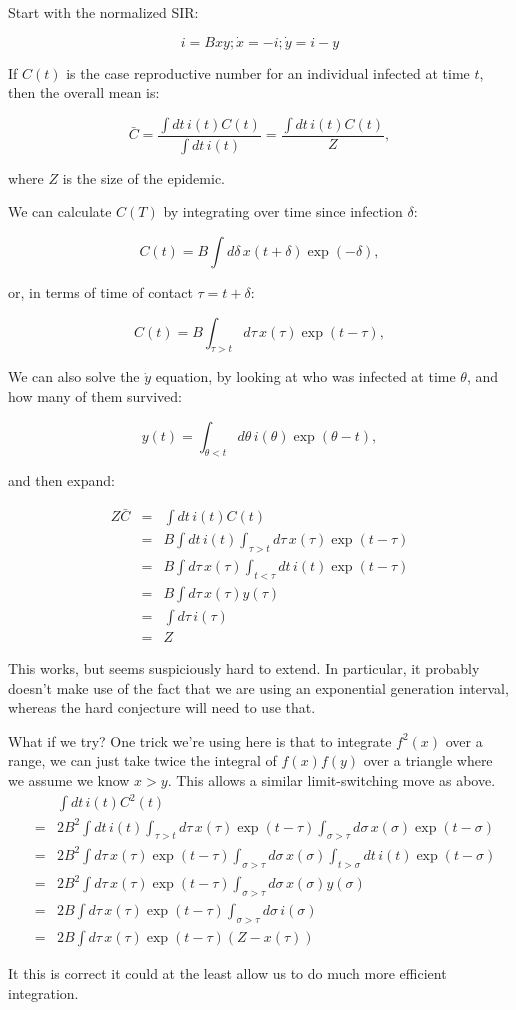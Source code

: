 \documentclass[12pt]{article}
\begin{document}
Start with the normalized SIR:

$$ i = Bxy; \dot x = -i; \dot y = i-y $$

If $C(t)$ is the case reproductive number for an individual infected at time $t$, then the overall mean is:

$$
	\bar C 
	= \frac{\int{dt\, i(t) C(t)}}{\int{dt\, i(t)}}
	= \frac{\int{dt\, i(t) C(t)}}{Z}, 
$$

where $Z$ is the size of the epidemic.

We can calculate $C(T)$ by integrating over time since infection $\delta$:

$$C(t) = B \int{d\delta\, x(t+\delta) \exp(-\delta)}, $$

or, in terms of time of contact $\tau=t+\delta$:

$$C(t) = B \int_{\tau>t}{d\tau\, x(\tau) \exp(t-\tau)}, $$

We can also solve the $\dot y$ equation, by looking at who was infected at time $\theta$, and how many of them survived:

$$ y(t) = \int_{\theta<t}{d\theta\, i(\theta)\exp(\theta-t)},$$

and then expand:

\begin{eqnarray}
	Z \bar C
	&=& \int{dt\, i(t) C(t)}
	\\ &=& B \int{dt\, i(t) \int_{\tau>t}{d\tau\, x(\tau) \exp(t-\tau)}}
	\\ &=& B \int{d\tau\, x(\tau) \int_{t<\tau}dt\, i(t) \exp(t-\tau)}
	\\ &=& B \int{d\tau\, x(\tau) y(\tau)}
	\\ &=& \int{d\tau\, i(\tau)}
	\\ &=& Z
\end{eqnarray}

This works, but seems suspiciously hard to extend. In particular, it probably doesn't make use of the fact that we are using an exponential generation interval, whereas the hard conjecture will need to use that.

What if we try? One trick we're using here is that to integrate $f^2(x)$ over a range, we can just take twice the integral of $f(x)f(y)$ over a triangle where we assume we know $x>y$. This allows a similar limit-switching move as above.
\begin{eqnarray}
	&& \int{dt\, i(t) C^2(t)}
	\\ &=& 2B^2 \int{dt\, i(t) \int_{\tau>t}{d\tau\, x(\tau) \exp(t-\tau)}}
		\int_{\sigma>\tau}{d\sigma\, x(\sigma) \exp(t-\sigma)}
	\\ &=& 2B^2 \int{d\tau\, x(\tau) \exp(t-\tau)}
		\int_{\sigma>\tau}{d\sigma\, x(\sigma)}
		\int_{t>\sigma}{dt\, i(t) \exp(t-\sigma)}
	\\ &=& 2B^2 \int{d\tau\, x(\tau) \exp(t-\tau)}
		\int_{\sigma>\tau}{d\sigma\, x(\sigma) y(\sigma)}
	\\ &=& 2B \int{d\tau\, x(\tau) \exp(t-\tau)}
		\int_{\sigma>\tau}{d\sigma\, i(\sigma)}
	\\ &=& 2B \int{d\tau\, x(\tau) \exp(t-\tau) (Z-x(\tau))}
\end{eqnarray}

It this is correct it could at the least allow us to do much more efficient integration.
\end{document}
